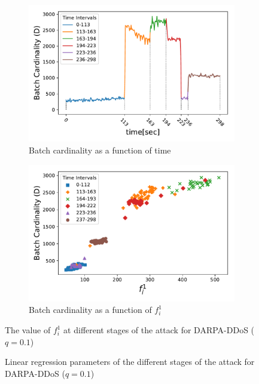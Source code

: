 		\begin{figure}[!bt]
			\centering
			\begin{subfigure}{.47\textwidth}
				\centering
				\includegraphics[width=.95\linewidth]{img/card_vs_time_darpa.pdf}
				\caption{Batch cardinality as a function of time}
				\label{fig:batch_card_vs_time}
			\end{subfigure}
			\hfill
			\begin{subfigure}{.47\textwidth}
				\centering
				\includegraphics[width=.95\linewidth]{img/f1_vs_card_darpa.pdf}
				\caption{Batch cardinality as a function of $f_i^1$}
				\label{fig:f1_vs_card_darpa}
			\end{subfigure}

			\caption{The value of $f_i^1$ at different stages of the attack for DARPA-DDoS ($q=0.1$)}
			\label{fig:freq_feature}
		\end{figure}

		\begin{figure}
			\centering
			\small
					
			\caption{Linear regression parameters of the different stages of the attack for DARPA-DDoS ($q=0.1$)}
			\label{table:darpa_pearson}
		\end{figure}
		
